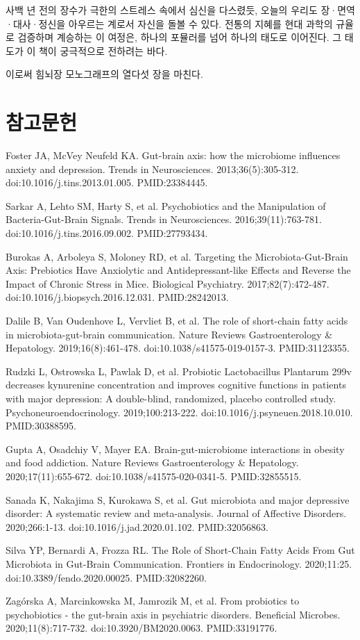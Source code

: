 \documentclass[11pt,oneside]{book}
\newcommand{\refstart}{\par\begingroup\footnotesize\setlength{\parskip}{2.5pt}\raggedright}
\newcommand{\reff}[2]{\par\hangindent=7mm\hangafter=1\noindent[#1]\hspace{2mm}#2\par}
\begin{document}
사백 년 전의 장수가 극한의 스트레스 속에서 심신을 다스렸듯, 오늘의 우리도 장·면역·대사·정신을 아우르는 계로서 자신을 돌볼 수 있다. 전통의 지혜를 현대 과학의 규율로 검증하며 계승하는 이 여정은, 하나의 포뮬러를 넘어 하나의 태도로 이어진다. 그 태도가 이 책이 궁극적으로 전하려는 바다.

이로써 힘뇌장 모노그래프의 열다섯 장을 마친다.

\section*{참고문헌}
\refstart
\reff{1}{Foster JA, McVey Neufeld KA. Gut-brain axis: how the microbiome influences anxiety and depression. Trends in Neurosciences. 2013;36(5):305-312. doi:10.1016/j.tins.2013.01.005. PMID:23384445.}
\reff{2}{Sarkar A, Lehto SM, Harty S, et al. Psychobiotics and the Manipulation of Bacteria-Gut-Brain Signals. Trends in Neurosciences. 2016;39(11):763-781. doi:10.1016/j.tins.2016.09.002. PMID:27793434.}
\reff{3}{Burokas A, Arboleya S, Moloney RD, et al. Targeting the Microbiota-Gut-Brain Axis: Prebiotics Have Anxiolytic and Antidepressant-like Effects and Reverse the Impact of Chronic Stress in Mice. Biological Psychiatry. 2017;82(7):472-487. doi:10.1016/j.biopsych.2016.12.031. PMID:28242013.}
\reff{4}{Dalile B, Van Oudenhove L, Vervliet B, et al. The role of short-chain fatty acids in microbiota-gut-brain communication. Nature Reviews Gastroenterology \& Hepatology. 2019;16(8):461-478. doi:10.1038/s41575-019-0157-3. PMID:31123355.}
\reff{5}{Rudzki L, Ostrowska L, Pawlak D, et al. Probiotic Lactobacillus Plantarum 299v decreases kynurenine concentration and improves cognitive functions in patients with major depression: A double-blind, randomized, placebo controlled study. Psychoneuroendocrinology. 2019;100:213-222. doi:10.1016/j.psyneuen.2018.10.010. PMID:30388595.}
\reff{6}{Gupta A, Osadchiy V, Mayer EA. Brain-gut-microbiome interactions in obesity and food addiction. Nature Reviews Gastroenterology \& Hepatology. 2020;17(11):655-672. doi:10.1038/s41575-020-0341-5. PMID:32855515.}
\reff{7}{Sanada K, Nakajima S, Kurokawa S, et al. Gut microbiota and major depressive disorder: A systematic review and meta-analysis. Journal of Affective Disorders. 2020;266:1-13. doi:10.1016/j.jad.2020.01.102. PMID:32056863.}
\reff{8}{Silva YP, Bernardi A, Frozza RL. The Role of Short-Chain Fatty Acids From Gut Microbiota in Gut-Brain Communication. Frontiers in Endocrinology. 2020;11:25. doi:10.3389/fendo.2020.00025. PMID:32082260.}
\reff{9}{Zagórska A, Marcinkowska M, Jamrozik M, et al. From probiotics to psychobiotics - the gut-brain axis in psychiatric disorders. Beneficial Microbes. 2020;11(8):717-732. doi:10.3920/BM2020.0063. PMID:33191776.}
\end{document}
